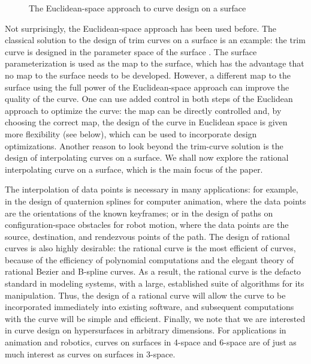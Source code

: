 \begin{figure}
\vspace{2.5in}
\caption{The Euclidean-space approach to curve design on a surface}
\label{fig:reduce}
\end{figure}

Not surprisingly, the Euclidean-space approach has been used before.
The classical solution to the design of trim curves on a surface 
is an example:
the trim curve is designed in the parameter space of the surface \cite{foley96}.
The surface parameterization is used as the map to the surface, %
which has the advantage that no map to the surface needs to be
developed.
However, a different map to the surface using the full power of
the Euclidean-space approach can improve the quality of the curve.
One can use added control in both steps of the Euclidean approach to optimize
the curve: the map can be directly controlled and, by choosing the
correct map, the design of the curve in Euclidean space is given more
flexibility (see below), which can be used to incorporate design optimizations.
Another reason to look beyond the trim-curve solution is the design of 
interpolating curves on a surface.
We shall now explore the rational interpolating curve on a surface,
which is the main focus of the paper.

The interpolation of data points is necessary in many applications:
for example, in the design of quaternion 
splines for computer animation, where the data points are the orientations of 
the known keyframes; or in the design of paths on configuration-space
obstacles for robot motion, where the data points are the source, destination,
and rendezvous points of the path.
The design of rational curves is also highly desirable:
the rational curve is the most efficient of curves, because of the efficiency
of polynomial computations and the elegant theory of rational Bezier
and B-spline curves.
As a result, the rational curve is the defacto standard in modeling systems, 
with a large, established suite of algorithms for its manipulation.
Thus, the design of a rational curve will allow the curve to be incorporated 
immediately into existing software, and subsequent computations with the curve
will be simple and efficient.
Finally, we note that we are interested in curve design on
hypersurfaces in arbitrary dimensions.
For applications in animation and robotics, 
curves on surfaces in 4-space and 6-space are of just as much
interest as curves on surfaces in 3-space.

